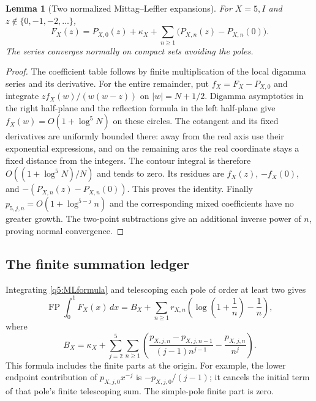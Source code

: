 \documentclass[11pt,a4paper]{article}
\numberwithin{equation}{section}
\newtheorem{lemma}[theorem]{Lemma}
\theoremstyle{definition}
\begin{document}
\begin{lemma}[Two normalized Mittag--Leffler expansions]
\label{q5:ML}
For $X=5,I$ and $z\notin\{0,-1,-2,\ldots\}$,
\begin{equation}\label{q5:MLformula}
 F_X(z)=P_{X,0}(z)+\kappa_X+
       \sum_{n\geq1}\bigl(P_{X,n}(z)-P_{X,n}(0)\bigr).
\end{equation}
The series converges normally on compact sets avoiding the poles.
\end{lemma}
\begin{proof}
The coefficient table follows by finite multiplication of the local
digamma series and its derivative.  For the entire remainder, put
$f_X=F_X-P_{X,0}$ and integrate
$z f_X(w)/(w(w-z))$ on $|w|=N+1/2$.
Digamma asymptotics in the right half-plane and the reflection formula
in the left half-plane give $f_X(w)=O(1+\log^5N)$ on these circles.
The cotangent and its fixed derivatives are uniformly bounded there:
away from the real axis use their exponential expressions, and on the
remaining arcs the real coordinate stays a fixed distance from the
integers.  The contour integral is therefore
$O((1+\log^5N)/N)$ and tends to zero.
Its residues are $f_X(z)$, $-f_X(0)$, and
$-(P_{X,n}(z)-P_{X,n}(0))$.  This proves the identity.
Finally $p_{5,j,n}=O(1+\log^{5-j}n)$ and the corresponding mixed
coefficients have no greater growth.  The two-point subtractions give
an additional inverse power of $n$, proving normal convergence.
\end{proof}

\subsection{The finite summation ledger}

Integrating \eqref{q5:MLformula} and telescoping each pole of order
at least two gives
\begin{equation}\label{q5:integrated}
 \operatorname{FP}\int_0^1F_X(x)\,dx
   =B_X+\sum_{n\geq1}r_{X,n}
        \left(\log\left(1+\frac1n\right)-\frac1n\right),
\end{equation}
where
\begin{equation}\label{q5:Bmechanism}
 B_X=\kappa_X+
  \sum_{j=2}^5\sum_{n\geq1}
    \left(\frac{p_{X,j,n}-p_{X,j,n-1}}{(j-1)n^{j-1}}
                       -\frac{p_{X,j,n}}{n^j}\right).
\end{equation}
This formula includes the finite parts at the origin.  For example,
the lower endpoint contribution of $p_{X,j,0}x^{-j}$ is
$-p_{X,j,0}/(j-1)$; it cancels the initial term of that pole's finite
telescoping sum.  The simple-pole finite part is zero.
\end{document}
